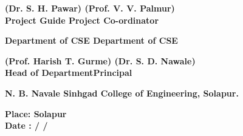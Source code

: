 \documentclass[12pt,a4paper,oneside]{report}
\begin{document}
\vspace{4.5cm}
\begin{center}
{\textbf{(Dr. S. H. Pawar) \hspace*{4.5cm} (Prof. V. V. Palmur) \\ \hspace*{1cm} Project Guide\hspace*{5.5cm} Project Co-ordinator}}
\end{center}
\vspace*{-0.2cm}
{\textbf{\hspace*{0.8cm}Department of CSE \hspace*{5.4cm} Department of CSE}
\vspace{1.8cm}
\begin{center}
{\textbf{(Prof. Harish T. Gurme) \hspace*{4.5cm} (Dr. S. D. Nawale) \\ \hspace*{-0.8cm} Head of Department\hspace*{6.2cm}Principal}}
\end{center}

\vspace{0.8cm}
\begin{center}
{\textbf{N. B. Navale Sinhgad College of Engineering, Solapur.}}
\end{center}
\vspace{0.6cm}
{\textbf{Place: Solapur}} \\
{\textbf{Date : \hspace*{1cm} / \hspace*{1cm}  /    }}




}
\end{document}
